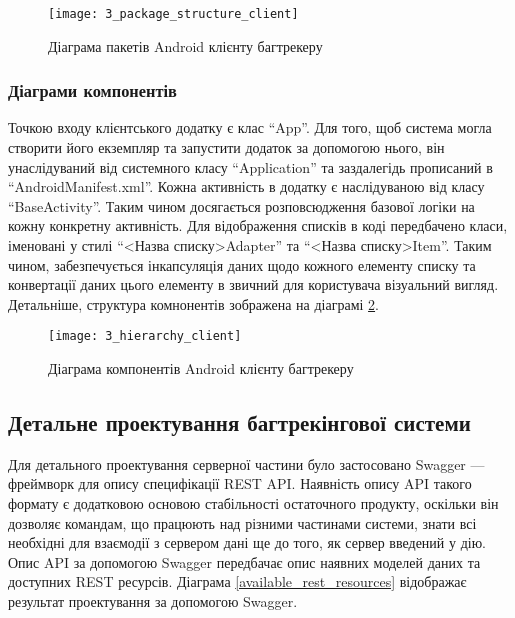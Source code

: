 \documentclass[../main.tex]{subfiles}
\begin{document}
			\begin{figure}[H]
				\centering
				\texttt{[image: 3\_package\_structure\_client]}
				\caption{Діаграма пакетів Android клієнту багтрекеру}
				\label{client_packages}
			\end{figure}
		
		\subsubsection{Діаграми компонентів}
		
			Точкою входу клієнтського додатку є клас \enquote{App}. Для того, щоб система могла створити його екземпляр та запустити додаток за допомогою нього, він унаслідуваний від системного класу \enquote{Application} та заздалегідь прописаний в \enquote{AndroidManifest.xml}. Кожна активність в додатку є наслідуваною від класу \enquote{BaseActivity}. Таким чином досягається розповсюдження базової логіки на кожну конкретну активність. Для відображення списків в коді передбачено класи, іменовані у стилі \enquote{<Назва списку>Adapter} та \enquote{<Назва списку>Item}. Таким чином, забезпечується інкапсуляція даних щодо кожного елементу списку та конвертації даних цього елементу в звичний для користувача візуальний вигляд. Детальніше, структура комнонентів зображена на діаграмі \ref{client_components}.
			
			\begin{figure}[H]
				\centering
				\texttt{[image: 3\_hierarchy\_client]}
				\caption{Діаграма компонентів Android клієнту багтрекеру}
				\label{client_components}
			\end{figure}
	
	\subsection{Детальне проектування багтрекінгової системи}
	
		Для детального проектування серверної частини було застосовано Swagger — фреймворк для опису специфікації REST API. Наявність опису API такого формату є додатковою основою стабільності остаточного продукту, оскільки він дозволяє командам, що працюють над різними частинами системи, знати всі необхідні для взаємодії з сервером дані ще до того, як сервер введений у дію. Опис API за допомогою Swagger передбачає опис наявних моделей даних та доступних REST ресурсів. Діаграма \ref{available_rest_resources} відображає результат проектування за допомогою Swagger.
		
\end{document}
